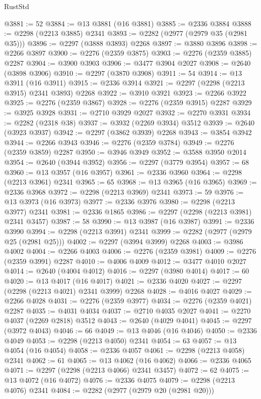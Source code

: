 \begin{lexlean}{RustStd}
\begin{coremodule}
@3881 := 52
@3884 := @13 @3881 (@16 @3881)
@3885 := @2336 @3884
@3888 := @2298 (@2213 @3885) @2341
@3893 := @2282 (@2977 (@2979 @35 (@2981 @35)))
@3896 := @2297 (@3888 @3893) @2268
@3897 := @3880 @3896
@3898 := @2266 @3897
@3900 := @2276 (@2359 @3875)
@3903 := @2276 (@2359 @3885) @2287
@3904 := @3900 @3903
@3906 := @3477 @3904 @2027
@3908 := @2640 (@3898 @3906)
@3910 := @2297 (@3870 @3908)
@3911 := 54
@3914 := @13 @3911 (@16 @3911)
@3915 := @2336 @3914
@3921 := @2297 (@2298 (@2213 @3915) @2341 @3893) @2268
@3922 := @3910 @3921
@3923 := @2266 @3922
@3925 := @2276 (@2359 @3867)
@3928 := @2276 (@2359 @3915) @2287
@3929 := @3925 @3928
@3931 := @2710 @3929 @2027
@3932 := @2270 @3931
@3934 := @2282 (@2318 @38)
@3937 := @3932 (@2269 @3934) @3512
@3939 := @2640 (@3923 @3937)
@3942 := @2297 (@3862 @3939) @2268
@3943 := @3854 @3942
@3944 := @2266 @3943
@3946 := @2276 (@2359 @3784)
@3949 := @2276 (@2359 @3859) @2287
@3950 := @3946 @3949
@3952 := @3588 @3950 @2014
@3954 := @2640 (@3944 @3952)
@3956 := @2297 (@3779 @3954)
@3957 := 68
@3960 := @13 @3957 (@16 @3957)
@3961 := @2336 @3960
@3964 := @2298 (@2213 @3961) @2341
@3965 := 65
@3968 := @13 @3965 (@16 @3965)
@3969 := @2336 @3968
@3972 := @2298 (@2213 @3969) @2341
@3973 := 59
@3976 := @13 @3973 (@16 @3973)
@3977 := @2336 @3976
@3980 := @2298 (@2213 @3977) @2341
@3981 := @2336 @1865
@3986 := @2297 (@2298 (@2213 @3981) @2341 @3457)
@3987 := 58
@3990 := @13 @3987 (@16 @3987)
@3991 := @2336 @3990
@3994 := @2298 (@2213 @3991) @2341
@3999 := @2282 (@2977 (@2979 @25 (@2981 @25)))
@4002 := @2297 (@3994 @3999) @2268
@4003 := @3986 @4002
@4004 := @2266 @4003
@4006 := @2276 (@2359 @3981)
@4009 := @2276 (@2359 @3991) @2287
@4010 := @4006 @4009
@4012 := @3477 @4010 @2027
@4014 := @2640 (@4004 @4012)
@4016 := @2297 (@3980 @4014)
@4017 := 60
@4020 := @13 @4017 (@16 @4017)
@4021 := @2336 @4020
@4027 := @2297 (@2298 (@2213 @4021) @2341 @3999) @2268
@4028 := @4016 @4027
@4029 := @2266 @4028
@4031 := @2276 (@2359 @3977)
@4034 := @2276 (@2359 @4021) @2287
@4035 := @4031 @4034
@4037 := @2710 @4035 @2027
@4041 := @2270 @4037 (@2269 @2818) @3512
@4043 := @2640 (@4029 @4041)
@4045 := @2297 (@3972 @4043)
@4046 := 66
@4049 := @13 @4046 (@16 @4046)
@4050 := @2336 @4049
@4053 := @2298 (@2213 @4050) @2341
@4054 := 63
@4057 := @13 @4054 (@16 @4054)
@4058 := @2336 @4057
@4061 := @2298 (@2213 @4058) @2341
@4062 := 61
@4065 := @13 @4062 (@16 @4062)
@4066 := @2336 @4065
@4071 := @2297 (@2298 (@2213 @4066) @2341 @3457)
@4072 := 62
@4075 := @13 @4072 (@16 @4072)
@4076 := @2336 @4075
@4079 := @2298 (@2213 @4076) @2341
@4084 := @2282 (@2977 (@2979 @20 (@2981 @20)))

\end{coremodule}
\end{lexlean}
